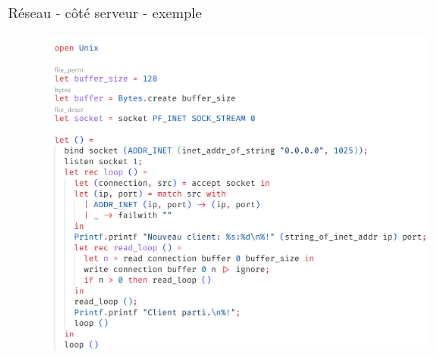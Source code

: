     
\begin{frame}[fragile]{Réseau - côté serveur - exemple}
    
\begin{figure}
    \centering
    \includegraphics[width=0.9\textwidth]{slides/images/unixsocketserver.png}
\end{figure}

\end{frame}